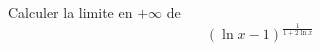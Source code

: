 Calculer la limite en $+\infty$ de
\begin{displaymath}
 \left( \ln x - 1\right)^{\frac{1}{1+2\ln x}} 
\end{displaymath}
\bigskip 
